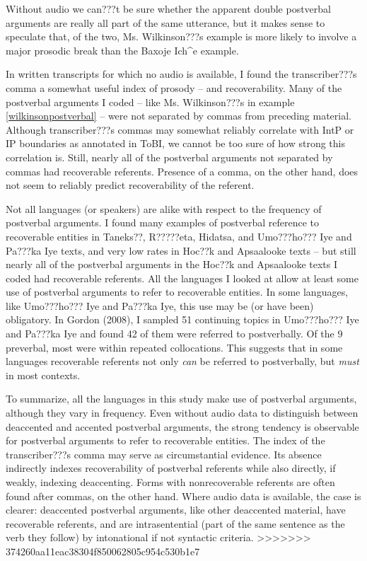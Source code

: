 \documentclass[output=paper]{LSP/langsci}
\begin{document}
Without audio we can???t be sure whether the apparent double postverbal arguments are really all part of the same utterance, but it makes sense to speculate that, of the two, Ms. Wilkinson???s example is more likely to involve a major prosodic break than the Baxoje Ich\^{}e example.

In written transcripts for which no audio is available, I found the transcriber???s comma a somewhat useful index of prosody -- and recoverability. Many of the postverbal arguments I coded -- like Ms. Wilkinson???s in example \ref{wilkinsonpostverbal} -- were not separated by commas from preceding material. Although transcriber???s commas may somewhat reliably correlate with IntP or IP boundaries as annotated in ToBI, we cannot be too sure of how strong this correlation is. Still, nearly all of the postverbal arguments not separated by commas had recoverable referents. Presence of a comma, on the other hand, does not seem to reliably predict recoverability of the referent.

Not all languages (or speakers) are alike with respect to the frequency of postverbal arguments. I found many examples of postverbal reference to recoverable entities in Taneks??, R?????eta, Hidatsa, and Umo???ho??? Iye and Pa???ka Iye texts, and very low rates in Hoc??k and Apsaalooke texts -- but still nearly all of the postverbal arguments in the Hoc??k and Apsaalooke texts I coded had recoverable referents. All the languages I looked at allow at least some use of postverbal arguments to refer to recoverable entities. In some languages, like Umo???ho??? Iye and Pa???ka Iye, this use may be (or have been) obligatory. In Gordon (2008), I sampled 51 continuing topics in Umo???ho??? Iye and Pa???ka Iye and found 42 of them were referred to postverbally. Of the 9 preverbal, most were within repeated collocations. This suggests that in some languages recoverable referents not only \emph{can} be referred to postverbally, but \emph{must} in most contexts.

To summarize, all the languages in this study make use of postverbal arguments, although they vary in frequency. Even without audio data to distinguish between deaccented and accented postverbal arguments, the strong tendency is observable for postverbal arguments to refer to recoverable entities. The index of the transcriber???s comma may serve as circumstantial evidence. Its absence indirectly indexes recoverability of postverbal referents while also directly, if weakly, indexing deaccenting. Forms with nonrecoverable referents are often found after commas, on the other hand. Where audio data is available, the case is clearer: deaccented postverbal arguments, like other deaccented material, have recoverable referents, and are intrasentential (part of the same sentence as the verb they follow) by intonational if not syntactic criteria.
>>>>>>> 374260aa11eac38304f850062805c954c530b1e7
\end{document}
